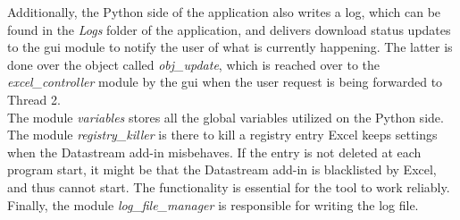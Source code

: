 Additionally, the Python side of the application also writes a log, which can be found in the \textit{Logs} folder of the application, and delivers download status updates to the gui module to notify the user of what is currently happening. The latter is done over the object called \textit{obj\_update}, which is reached over to the \textit{excel\_controller} module by the gui when the user request is being forwarded to Thread 2. \\

The module \textit{variables} stores all the global variables utilized on the Python side. The module \textit{registry\_killer} is there to kill a registry entry Excel keeps settings when the Datastream add-in misbehaves. If the entry is not deleted at each program start, it might be that the Datastream add-in is blacklisted by Excel, and thus cannot start. The functionality is essential for the tool to work reliably. Finally, the module \textit{log\_file\_manager} is responsible for writing the log file. 

%







